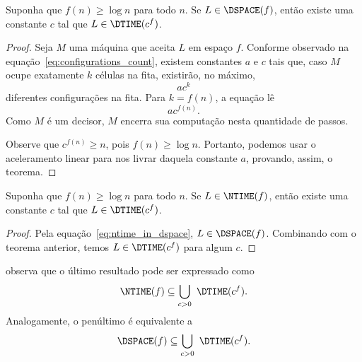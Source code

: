\begin{theorem}
    Suponha que $f(n) \geq \log n$ para todo $n$.
    Se $L \in \DSPACE(f)$,
    então existe uma constante $c$
    tal que $L \in \DTIME(c^f)$.
    \label{tmh:dspace_in_dtime}
\end{theorem}

\begin{proof}
    Seja $M$ uma máquina que aceita $L$ em espaço $f$.
    Conforme observado na equação~\ref{eq:configurations_count},
    existem constantes $a$ e $c$ tais que,
    caso $M$ ocupe exatamente $k$ células na fita,
    existirão, no máximo,
    \begin{equation*}
        ac^k
    \end{equation*}
    diferentes configurações na fita.
    Para $k = f(n)$, a equação lê
    \begin{equation*}
        ac^{f(n)}.
    \end{equation*}
    Como $M$ é um decisor,
    $M$ encerra sua computação nesta quantidade de passos.

    Observe que $c^{f(n)} \geq n$, pois $f(n) \geq \log n$.
    Portanto, podemos usar o aceleramento linear
    para nos livrar daquela constante $a$,
    provando, assim, o teorema.
\end{proof}

\begin{theorem}
    Suponha que $f(n) \geq \log n$ para todo $n$.
    Se $L \in \NTIME(f)$,
    então existe uma constante $c$
    tal que $L \in \DTIME(c^f)$.
\end{theorem}

\begin{proof}
    Pela equação~\ref{eq:ntime_in_dspace},
    $L \in \DSPACE(f)$.
    Combinando com o teorema anterior,
    temos $L \in \DTIME(c^f)$ para algum $c$.
\end{proof}

 observa que
o último resultado pode ser expressado como
\begin{equation*}
    \NTIME(f) \subseteq \bigcup_{c > 0} \ \DTIME(c^f).
\end{equation*}
Analogamente, o penúltimo é equivalente a
\begin{equation*}
    \DSPACE(f) \subseteq \bigcup_{c > 0} \ \DTIME(c^f).
\end{equation*}
